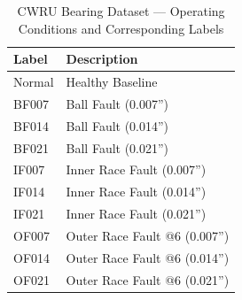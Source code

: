 \documentclass[journal]{IEEEtran}
\begin{document}
\begin{table}
	\caption{CWRU Bearing Dataset — Operating Conditions and Corresponding Labels}
	\centering
	\begin{tabular}{ll}
		\toprule
		Label & Description \\
		\midrule
		Normal & Healthy Baseline \\
		BF007 & Ball Fault (0.007'') \\
		BF014 & Ball Fault (0.014'') \\
		BF021 & Ball Fault (0.021'') \\
		IF007 & Inner Race Fault (0.007'') \\
		IF014 & Inner Race Fault (0.014'') \\
		IF021 & Inner Race Fault (0.021'') \\
		OF007 & Outer Race Fault @6 (0.007'') \\
		OF014 & Outer Race Fault @6 (0.014'') \\
		OF021 & Outer Race Fault @6 (0.021'') \\
		
		\bottomrule
	\end{tabular}
	\label{tab:operating_conditions}
\end{table}
\end{document}
